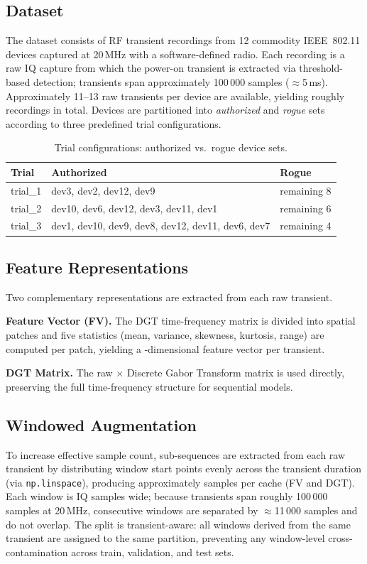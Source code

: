 \subsection{Dataset}
The dataset consists of RF transient recordings from 12 commodity IEEE~802.11 devices captured at 20\,MHz with a software-defined radio. Each recording is a raw IQ capture from which the power-on transient is extracted via threshold-based detection; transients span approximately 100\,000 samples ($\approx$5\,ms). Approximately 11--13 raw transients per device are available, yielding roughly \nTransients{} recordings in total. Devices are partitioned into \emph{authorized} and \emph{rogue} sets according to three predefined trial configurations.

\begin{table}[htbp]
\centering
\caption{Trial configurations: authorized vs.\ rogue device sets.}
\begin{tabular}{lll}
\toprule
\textbf{Trial} & \textbf{Authorized} & \textbf{Rogue} \\
\midrule
trial\_1 & dev3, dev2, dev12, dev9 & remaining 8 \\
trial\_2 & dev10, dev6, dev12, dev3, dev11, dev1 & remaining 6 \\
trial\_3 & dev1, dev10, dev9, dev8, dev12, dev11, dev6, dev7 & remaining 4 \\
\bottomrule
\end{tabular}
\end{table}

\subsection{Feature Representations}
Two complementary representations are extracted from each raw transient.

\textbf{Feature Vector (FV).} The DGT time-frequency matrix is divided into spatial patches and five statistics (mean, variance, skewness, kurtosis, range) are computed per patch, yielding a \fvDim-dimensional feature vector per transient.

\textbf{DGT Matrix.} The raw \dgtRows$\times$\dgtCols{} Discrete Gabor Transform matrix is used directly, preserving the full time-frequency structure for sequential models.

\subsection{Windowed Augmentation}
To increase effective sample count, \nWindowsPerTransient{} sub-sequences are extracted from each raw transient by distributing window start points evenly across the transient duration (via \texttt{np.linspace}), producing approximately \nWindowedSamples{} samples per cache (FV and DGT). Each window is \windowWidthIQ{} IQ samples wide; because transients span roughly 100\,000 samples at 20\,MHz, consecutive windows are separated by $\approx$11\,000 samples and do not overlap. The split is transient-aware: all windows derived from the same transient are assigned to the same partition, preventing any window-level cross-contamination across train, validation, and test sets.

